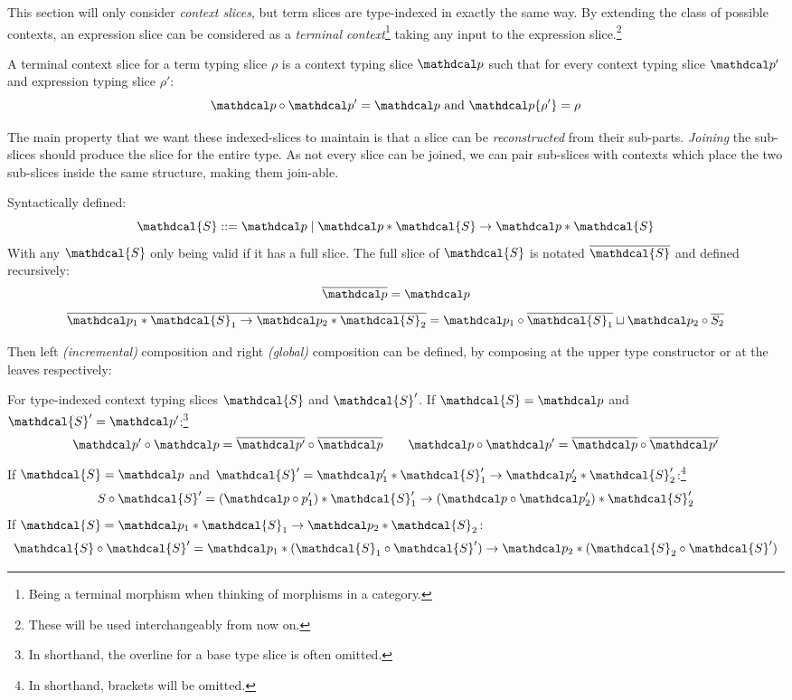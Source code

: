 This section will only consider \textit{context slices}, but term slices are type-indexed in exactly the same way. By extending the class of possible contexts, an expression slice can be considered as a \textit{terminal context}\footnote{Being a terminal morphism when thinking of morphisms in a category.} taking any input to the expression slice.\footnote{These will be used interchangeably from now on.}
\begin{definition}
A terminal context slice for a term typing slice $\rho$ is a context typing slice $\p$ such that for every context typing slice $\p'$ and expression typing slice $\rho'$:
\[\p \circ \p' = \p \text{ and } \p\{\rho'\} = \rho\]
\end{definition}

The main property that we want these indexed-slices to maintain is that a slice can be \textit{reconstructed} from their sub-parts. \textit{Joining} the sub-slices should produce the slice for the entire type. As not every slice can be joined, we can pair sub-slices with contexts which place the two sub-slices inside the same structure, making them join-able.

\renewcommand{\S}{\mathdcal{S}}
\newcommand{\s}{\mathdcal{s}}
\begin{definition}
Syntactically defined: 
\[\S ::= \p \mid \p * \S \to \p * \S\] 
With any $\S$ only being valid if it has a full slice. The full slice of $\S$ is notated $\overline{\S}$ and defined recursively:
\[\overline{\p} = \p\]
\[\overline{\p_1 * \S_1 \to \p_2 * \S_2} = \p_1 \circ \overline{\S_1} \sqcup \p_2 \circ \overline{S_2}\]
\end{definition}
Then left \textit{(incremental)} composition and right \textit{(global)} composition can be defined, by composing at the upper type constructor or at the leaves respectively:
\begin{definition}
For type-indexed context typing slices $\S$ and $\S'$.  If $\S = \p$ and $\S' = \p'$:\footnote{In shorthand, the overline for a base type slice is often omitted.}
\[\p' \circ \p = \overline{\p'} \circ \overline{\p}\qquad \p \circ \p' = \overline{\p} \circ \overline{\p'}\]
If $\S = \p$ and $\S' = \p_1' * \S_1' \to \p_2' * \S_2'$:\footnote{In shorthand, brackets will be omitted.}
\[S \circ \S' = (\p \circ p_1') * \S_1' \to (\p \circ \p_2') * \S_2'\]
If $\S = \p_1 * \S_1 \to \p_2 * \S_2$:
\[\S \circ \S' = \p_1 * (\S_1 \circ \S') \to \p_2 * (\S_2 \circ \S')\]
\end{definition}

